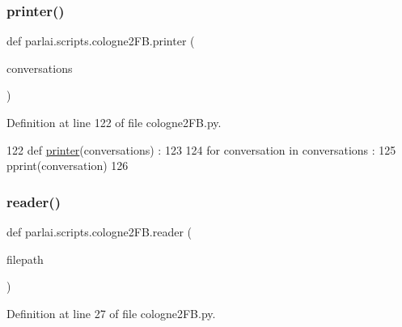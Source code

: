\subsubsection{\texorpdfstring{printer()}{printer()}}
{\footnotesize\ttfamily def parlai.\+scripts.\+cologne2\+F\+B.\+printer (\begin{DoxyParamCaption}\item[{}]{conversations }\end{DoxyParamCaption})}



Definition at line 122 of file cologne2\+F\+B.\+py.


\begin{DoxyCode}
122 \textcolor{keyword}{def }\hyperlink{namespaceparlai_1_1scripts_1_1cologne2FB_a82c4edd06c5b6498faa16f8481278be4}{printer}(conversations) : 
123 
124     \textcolor{keywordflow}{for} conversation \textcolor{keywordflow}{in} conversations : 
125         pprint(conversation)
126 
\end{DoxyCode}
\mbox{\label{namespaceparlai_1_1scripts_1_1cologne2FB_ac3f89c025290a81b76a7573f7c1e5d7a}} 
\subsubsection{\texorpdfstring{reader()}{reader()}}
{\footnotesize\ttfamily def parlai.\+scripts.\+cologne2\+F\+B.\+reader (\begin{DoxyParamCaption}\item[{}]{filepath }\end{DoxyParamCaption})}



Definition at line 27 of file cologne2\+F\+B.\+py.


